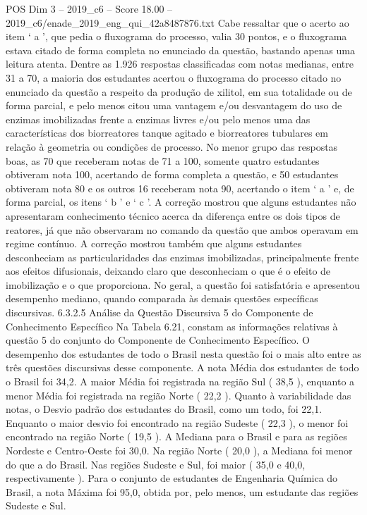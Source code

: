\begin{textsample}{POS Dim 3 – 2019\_c6 – Score 18.00 – 2019\_c6/enade\_2019\_eng\_qui\_42a8487876.txt}
Cabe ressaltar que o acerto ao item ‘ a ’, que pedia o fluxograma do processo, valia 30 pontos, e o fluxograma estava citado de forma completa no enunciado da questão, bastando apenas uma leitura atenta.
Dentre as 1.926 respostas classificadas com notas medianas, entre 31 a 70, a maioria dos estudantes acertou o fluxograma do processo citado no enunciado da questão a respeito da produção de xilitol, em sua totalidade ou de forma parcial, e pelo menos citou uma vantagem e/ou desvantagem do uso de enzimas imobilizadas frente a enzimas livres e/ou pelo menos uma das características dos biorreatores tanque agitado e biorreatores tubulares em relação à geometria ou condições de processo.
No menor grupo das respostas boas, as 70 que receberam notas de 71 a 100, somente quatro estudantes obtiveram nota 100, acertando de forma completa a questão, e 50 estudantes obtiveram nota 80 e os outros 16 receberam nota 90, acertando o item ‘ a ’ e, de forma parcial, os itens ‘ b ’ e ‘ c ’.
A correção mostrou que alguns estudantes não apresentaram conhecimento técnico acerca da diferença entre os dois tipos de reatores, já que não observaram no comando da questão que ambos operavam em regime contínuo.
A correção mostrou também que alguns estudantes desconheciam as particularidades das enzimas imobilizadas, principalmente frente aos efeitos difusionais, deixando claro que desconheciam o que é o efeito de imobilização e o que proporciona.
No geral, a questão foi satisfatória e apresentou desempenho mediano, quando comparada às demais questões específicas discursivas. 6.3.2.5 Análise da Questão Discursiva 5 do Componente de Conhecimento Específico Na Tabela 6.21, constam as informações relativas à questão 5 do conjunto do Componente de Conhecimento Específico.
O desempenho dos estudantes de todo o Brasil nesta questão foi o mais alto entre as três questões discursivas desse componente.
A nota Média dos estudantes de todo o Brasil foi 34,2.
A maior Média foi registrada na região Sul ( 38,5 ), enquanto a menor Média foi registrada na região Norte ( 22,2 ).
Quanto à variabilidade das notas, o Desvio padrão dos estudantes do Brasil, como um todo, foi 22,1.
Enquanto o maior desvio foi encontrado na região Sudeste ( 22,3 ), o menor foi encontrado na região Norte ( 19,5 ).
A Mediana para o Brasil e para as regiões Nordeste e Centro-Oeste foi 30,0.
Na região Norte ( 20,0 ), a Mediana foi menor do que a do Brasil.
Nas regiões Sudeste e Sul, foi maior ( 35,0 e 40,0, respectivamente ).
Para o conjunto de estudantes de Engenharia Química do Brasil, a nota Máxima foi 95,0, obtida por, pelo menos, um estudante das regiões Sudeste e Sul.

\end{textsample}
